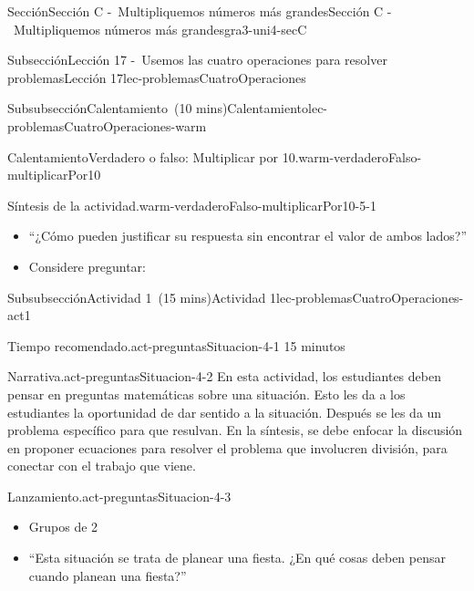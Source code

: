 \documentclass[oneside,10pt,]{article}
\newlength{\fillinmaxwidth}
\newlength{\fillincontract}
\newlength{\charmaxwidth}\setlength{\charmaxwidth}{0.5em}
\newlength{\charminwidth}\setlength{\charminwidth}{0.1em}
\newlength{\fillinheight}
\newcommand{\fillintext}[1]{%
\setlength{\fillinmaxwidth}{#1\charmaxwidth}%
\setlength{\fillincontract}{#1\charminwidth}%
\setlength{\fillinheight}{\baselineskip}\addtolength{\fillinheight}{1.2pt}%
\strut\nobreak\leaders\vbox{\hrule width 0.3pt height 0.3pt \vskip -1.2pt}\hskip 1\fillinmaxwidth minus \fillincontract\nobreak\strut%
}
\begin{document}
\begin{sectionptx}{Sección}{Sección C -~Multipliquemos números más grandes}{}{Sección C -~Multipliquemos números más grandes}{}{}{gra3-uni4-secC}
\begin{subsectionptx}{Subsección}{Lección 17 -~Usemos las cuatro operaciones para resolver problemas}{}{Lección 17}{}{}{lec-problemasCuatroOperaciones}
\begin{subsubsectionptx}{Subsubsección}{Calentamiento~(10 mins)}{}{Calentamiento}{}{}{lec-problemasCuatroOperaciones-warm}
\begin{exploration}{Calentamiento}{Verdadero o falso: Multiplicar por 10.}{warm-verdaderoFalso-multiplicarPor10}
\end{exploration}%
\par
\begin{paragraphs}{Síntesis de la actividad.}{warm-verdaderoFalso-multiplicarPor10-5-1}%
%
\begin{itemize}[label=\textbullet]
\item{}``¿Cómo pueden justificar su respuesta sin encontrar el valor de ambos lados?''%
\item{}Considere preguntar:%
%
\end{itemize}
\end{paragraphs}%
\end{subsubsectionptx}
%
%
\typeout{************************************************}
\typeout{************************************************}
%
\begin{subsubsectionptx}{Subsubsección}{Actividad 1~(15 mins)}{}{Actividad 1}{}{}{lec-problemasCuatroOperaciones-act1}
\par
\begin{paragraphs}{Tiempo recomendado.}{act-preguntasSituacion-4-1}%
15 minutos%
\end{paragraphs}%
\begin{paragraphs}{Narrativa.}{act-preguntasSituacion-4-2}%
En esta actividad, los estudiantes deben pensar en preguntas matemáticas sobre una situación. Esto les da a los estudiantes la oportunidad de dar sentido a la situación. Después se les da un problema específico para que resulvan. En la síntesis, se debe enfocar la discusión en proponer ecuaciones para resolver el problema que involucren división, para conectar con el trabajo que viene.%
\end{paragraphs}%
\begin{paragraphs}{Lanzamiento.}{act-preguntasSituacion-4-3}%
%
\begin{itemize}[label=\textbullet]
\item{}Grupos de 2%
\item{}``Esta situación se trata de planear una fiesta. ¿En qué cosas deben pensar cuando planean una fiesta?''%

\end{itemize}
\end{paragraphs}
\end{subsubsectionptx}
\end{subsectionptx}
\end{sectionptx}
\end{document}
